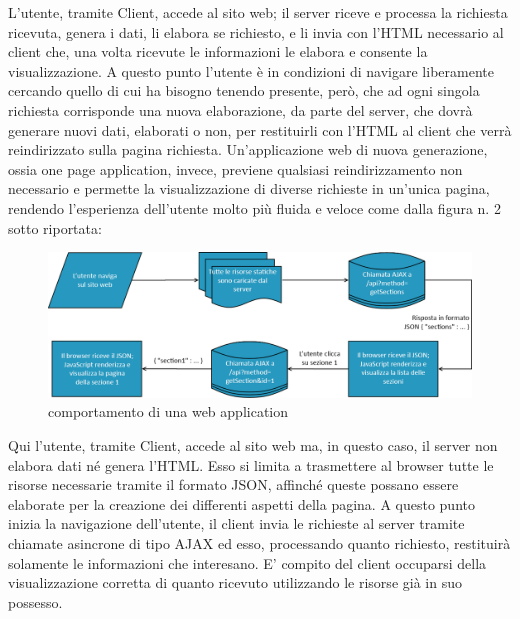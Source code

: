 L’utente, tramite Client, accede al sito web; il server riceve e processa la richiesta ricevuta, genera i dati, li elabora se richiesto, e li invia con l’HTML necessario al client che, una volta ricevute le informazioni le elabora e consente la visualizzazione. A questo punto l’utente è in condizioni di navigare liberamente cercando quello di cui ha bisogno tenendo presente, però, che ad ogni singola richiesta corrisponde una nuova elaborazione, da parte del server, che dovrà generare nuovi dati, elaborati o non, per restituirli con l’HTML al client che verrà reindirizzato sulla pagina richiesta.
\newpage
Un’applicazione web di nuova generazione, ossia one page application, invece, previene qualsiasi reindirizzamento non necessario e permette la visualizzazione di diverse richieste in un’unica pagina, rendendo l’esperienza dell’utente molto più fluida e veloce come dalla figura n. 2 sotto riportata:

\vspace{1cm}
\begin{figure}[htbp]
\begin{center}
\includegraphics[width=13cm]{contents/images/web_application}
\end{center}
\caption{comportamento di una web application}
\label{fig:flow_1}
\end{figure}
\vspace{1cm}

Qui l’utente, tramite Client, accede al sito web ma, in questo caso, il server non elabora dati né genera l’HTML. Esso si limita a trasmettere al browser tutte le risorse necessarie tramite il formato JSON, affinché queste possano essere elaborate per la creazione dei differenti aspetti della pagina. A questo punto inizia la navigazione dell’utente, il client invia le richieste al server tramite chiamate asincrone di tipo AJAX ed esso, processando quanto richiesto, restituirà solamente le informazioni che interesano. E’ compito del client occuparsi della visualizzazione corretta di quanto ricevuto utilizzando le risorse già in suo possesso.

